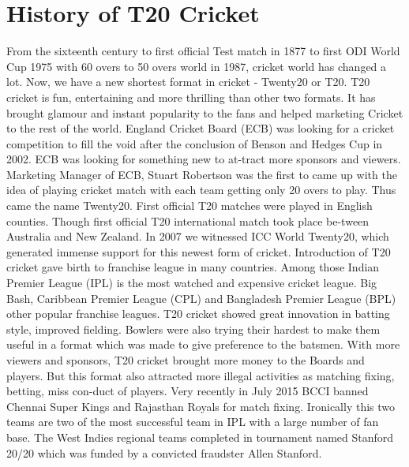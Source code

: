 \section{History of T20 Cricket }
From the sixteenth century to first official Test match in 1877 to first ODI World Cup 1975 with 60 overs to 50 overs world in 1987, cricket world has changed a lot. Now, we have a new shortest format in cricket - Twenty20 or T20. T20 cricket is fun, entertaining and more thrilling than other two formats. It has brought glamour and instant popularity to the fans and helped marketing Cricket to the rest of the world. England Cricket Board (ECB) was looking for a cricket competition to fill the void after the conclusion of Benson and Hedges Cup in 2002. ECB was looking for something new to at-tract more sponsors and viewers. Marketing Manager of ECB, Stuart Robertson was the first to came up with the idea of playing cricket match with each team getting only 20 overs to play. Thus came the name Twenty20. First official T20 matches were played in English counties. Though first official T20 international match took place be-tween Australia and New Zealand. In 2007 we witnessed ICC World Twenty20, which generated immense support for this newest form of cricket. Introduction of T20 cricket gave birth to franchise league in many countries. Among those Indian Premier League (IPL) is the most watched and expensive cricket league. Big Bash, Caribbean Premier League (CPL) and Bangladesh Premier League (BPL) other popular franchise leagues. T20 cricket showed great innovation in batting style, improved fielding. Bowlers were also trying their hardest to make them useful in a format which was made to give preference to the batsmen. With more viewers and sponsors, T20 cricket brought more money to the Boards and players. But this format also attracted more illegal activities as matching fixing, betting, miss con-duct of players. Very recently in July 2015 BCCI banned Chennai Super Kings and Rajasthan Royals for match fixing. Ironically this two teams are two of the most successful team in IPL with a large number of fan base. The West Indies regional teams completed in tournament named Stanford 20/20 which was funded by a convicted fraudster Allen Stanford.
